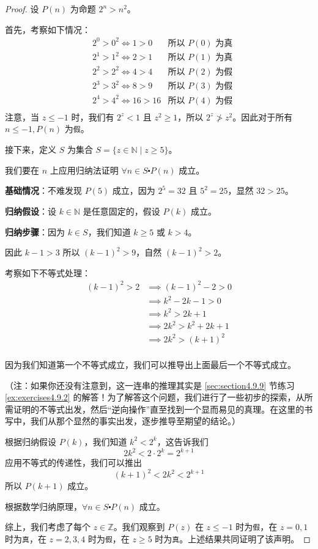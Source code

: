 \begin{proof}
    设 $P(n)$ 为命题 $2^n > n^2$。

    首先，考察如下情况：
    \begin{align*}
        & 2^0 > 0^2 \iff 1>0 & \text{所以 } P(0) \text{ 为真}\\
        & 2^1 > 1^2 \iff 2>1 & \text{所以 } P(1) \text{ 为真}\\
        & 2^2 > 2^2 \iff 4>4 &  \text{所以 } P(2) \text{ 为假}\\
        & 2^3 > 3^2 \iff 8>9 &  \text{所以 } P(3) \text{ 为假}\\
        & 2^4 > 4^2 \iff 16>16 & \text{所以 } P(4) \text{ 为假}\\
    \end{align*}
    注意，当 $z \le -1$ 时，我们有 $2^z < 1$ 且 $z^2 \ge 1$，所以 $2^z \ngtr z^2$。因此对于所有 $n \le -1, P(n)$ 为\verb|假|。

    接下来，定义 $S$ 为集合 $S = \{z \in \mathbb{N} \mid z \ge 5\}$。

    我们要在 $n$ 上应用归纳法证明 $\forall n \in S \centerdot P(n)$ 成立。

    \textbf{基础情况}：不难发现 $P(5)$ 成立，因为 $2^5=32$ 且 $5^2=25$，显然 $32 > 25$。

    \textbf{归纳假设}：设 $k \in \mathbb{N}$ 是任意固定的，假设 $P(k)$ 成立。

    \textbf{归纳步骤}：因为 $k \in S$，我们知道 $k \ge 5$ 或 $k > 4$。
    
    因此 $k-1>3$ 所以 $(k-1)^2>9$，自然 $(k-1)^2>2$。

    考察如下不等式处理：
    \begin{align*}
        (k-1)^2 > 2 &\implies (k-1)^2-2>0 \\
        &\implies k^2-2k-1>0 \\
        &\implies k^2>2k+1 \\
        &\implies 2k^2>k^2+2k+1 \\
        &\implies 2k^2>(k+1)^2 \\
    \end{align*}

    因为我们知道第一个不等式成立，我们可以推导出上面最后一个不等式成立。

    （注：如果你还没有注意到，这一连串的推理其实是 \ref{sec:section4.9.9} 节练习 \ref{ex:exercises4.9.2} 的解答！为了解答这个问题，我们进行了一些初步的探索，从所需证明的不等式出发，然后``逆向操作''直至找到一个显而易见的真理。在这里的书写中，我们从那个显然的事实出发，逐步推导至期望的结论。）

    根据归纳假设 $P(k)$，我们知道 $k^2 < 2^k$，这告诉我们
    \[2k^2 < 2 \cdot 2^k = 2^{k+1}\]
    应用不等式的传递性，我们可以推出
    \[(k + 1)^2 < 2k^2 < 2^{k+1}\]
    所以 $P(k+1)$ 成立。

    根据数学归纳原理，$\forall n \in S \centerdot P(n)$ 成立。

    综上，我们考虑了每个 $z \in \mathbb{Z}$。我们观察到 $P(z)$ 在 $z \le -1$ 时为\verb|假|，在 $z = 0, 1$ 时为\verb|真|，在 $z = 2, 3, 4$ 时为\verb|假|，在 $z \ge 5$ 时为\verb|真|。上述结果共同证明了该声明。
\end{proof}

